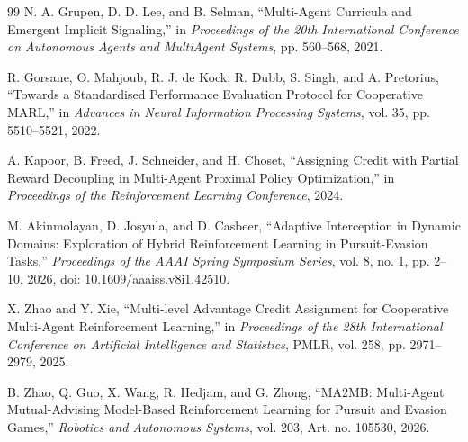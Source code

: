 \documentclass[journal]{IEEEtran}
\begin{document}
\begin{thebibliography}{99}
N. A. Grupen, D. D. Lee, and B. Selman,
``Multi-Agent Curricula and Emergent Implicit Signaling,''
in \textit{Proceedings of the 20th International Conference on Autonomous Agents and MultiAgent Systems}, pp. 560--568, 2021.

R. Gorsane, O. Mahjoub, R. J. de Kock, R. Dubb, S. Singh, and A. Pretorius,
``Towards a Standardised Performance Evaluation Protocol for Cooperative MARL,''
in \textit{Advances in Neural Information Processing Systems}, vol. 35, pp. 5510--5521, 2022.

A. Kapoor, B. Freed, J. Schneider, and H. Choset,
``Assigning Credit with Partial Reward Decoupling in Multi-Agent Proximal Policy Optimization,''
in \textit{Proceedings of the Reinforcement Learning Conference}, 2024.

M. Akinmolayan, D. Josyula, and D. Casbeer,
``Adaptive Interception in Dynamic Domains: Exploration of Hybrid Reinforcement Learning in Pursuit-Evasion Tasks,''
\textit{Proceedings of the AAAI Spring Symposium Series}, vol. 8, no. 1,
pp. 2--10, 2026, doi: 10.1609/aaaiss.v8i1.42510.

X. Zhao and Y. Xie,
``Multi-level Advantage Credit Assignment for Cooperative Multi-Agent Reinforcement Learning,''
in \textit{Proceedings of the 28th International Conference on Artificial Intelligence and Statistics}, PMLR, vol. 258, pp. 2971--2979, 2025.

B. Zhao, Q. Guo, X. Wang, R. Hedjam, and G. Zhong,
``MA2MB: Multi-Agent Mutual-Advising Model-Based Reinforcement Learning for Pursuit and Evasion Games,''
\textit{Robotics and Autonomous Systems}, vol. 203, Art. no. 105530, 2026.

\end{thebibliography}
\end{document}
